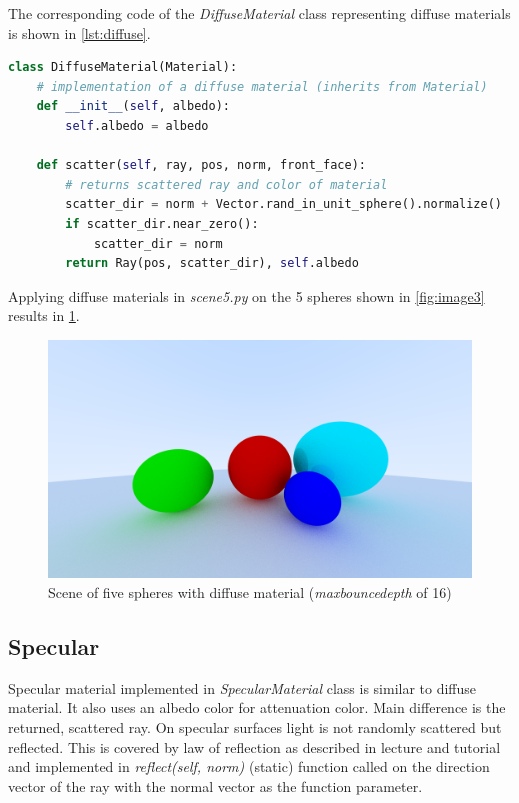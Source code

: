 \documentclass[]{article}
\begin{document}
		The corresponding code of the \emph{DiffuseMaterial} class representing diffuse materials is shown in \cref{lst:diffuse}.
		\begin{lstlisting}[caption={\emph{DiffuseMaterial} class}, language=Python, label=lst:diffuse]
class DiffuseMaterial(Material):
	# implementation of a diffuse material (inherits from Material)
	def __init__(self, albedo):
		self.albedo = albedo
	
	def scatter(self, ray, pos, norm, front_face):
		# returns scattered ray and color of material
		scatter_dir = norm + Vector.rand_in_unit_sphere().normalize()
		if scatter_dir.near_zero():
			scatter_dir = norm
		return Ray(pos, scatter_dir), self.albedo
		\end{lstlisting}
		
		Applying diffuse materials in \emph{scene5.py} on the 5 spheres shown in \cref{fig:image3} results in \cref{fig:image5}.
		
		\begin{figure}[h]
			\centering
			\includegraphics[width=0.9\linewidth]{image5-5}
			\caption{Scene of five spheres with diffuse material  (\emph{max\textunderscore bounce\textunderscore depth} of 16)}
			\label{fig:image5}
		\end{figure}
		 
		\subsection{Specular}
		Specular material implemented in \emph{SpecularMaterial} class is similar to diffuse material. It also uses an albedo color for attenuation color. Main difference is the returned, scattered ray. On specular surfaces light is not randomly scattered but reflected. This is covered by law of reflection as described in lecture and tutorial and implemented in \emph{reflect(self, norm)} (static) function called on the direction vector of the ray with the normal vector as the function parameter.
		
\end{document}
